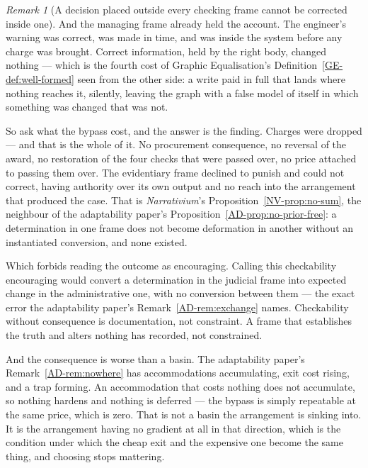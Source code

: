 \documentclass[11pt,a4paper]{article}
\theoremstyle{remark}
\newtheorem{remark}[definition]{Remark}
\begin{document}
\begin{remark}[A decision placed outside every checking frame cannot be corrected inside one]
And the managing frame already held the account. The engineer's warning was correct, was made in
time, and was inside the system before any charge was brought. Correct information, held by the
right body, changed nothing --- which is the fourth cost of Graphic Equalisation's Definition~\ref{GE-def:well-formed}
seen from the other side: a
write paid in full that lands where nothing reaches it, silently, leaving the graph with a false model of
itself in which something was changed that was not.

So ask what the bypass cost, and the answer is the finding. Charges were dropped --- and that is
the whole of it. No procurement consequence, no reversal of the award, no restoration of the four checks
that were passed over, no price attached to passing them over. The evidentiary frame declined to
punish and could not correct, having authority over its own output and no reach into the arrangement
that produced the case. That is \emph{Narrativium}'s Proposition~\ref{NV-prop:no-sum}, the neighbour of the adaptability paper's Proposition~\ref{AD-prop:no-prior-free}: a determination in one frame does not become deformation in another without an instantiated
conversion, and none existed.

Which forbids reading the outcome as encouraging. Calling this checkability encouraging would
convert a determination in the judicial frame into expected change in the administrative one, with no
conversion between them --- the exact error the adaptability paper's Remark~\ref{AD-rem:exchange}
names. Checkability without consequence is documentation, not constraint. A frame that
establishes the truth and alters nothing has recorded, not constrained.

And the consequence is worse than a basin. The adaptability paper's Remark~\ref{AD-rem:nowhere} has accommodations
accumulating, exit cost rising, and a trap forming. An accommodation that costs nothing does not
accumulate, so nothing hardens and nothing is deferred --- the bypass is simply repeatable at the
same price, which is zero. That is not a basin the arrangement is sinking into. It is the arrangement
having no gradient at all in that direction, which is the condition under which the cheap exit and the
expensive one become the same thing, and choosing stops mattering.
\end{remark}
\end{document}
